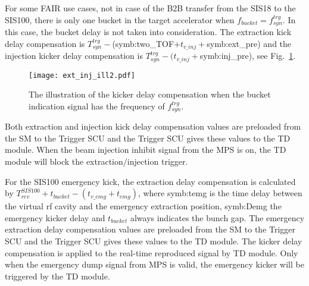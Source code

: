 For some FAIR use cases, not in case of the B2B transfer from the SIS18 to the SIS100, there is only one bucket in the target accelerator when $f_{\mathit{bucket}}=f_{\mathit{syn}}^{\mathit{trg}}$. In this case, the bucket delay is not taken into consideration. The extraction kick delay compensation is $T_{\mathit{syn}}^{\mathit{trg}} -$(\gls{symb:two_TOF}$ + t_{v\_inj}+ $\gls{symb:ext_pre}) and the injection kicker delay compensation is $T_{\mathit{syn}}^{\mathit{trg}} - (t_{v\_inj}+ $\gls{symb:inj_pre}), see Fig.~\ref{ext_inj_kicker1}. 
\begin{figure}[!htb]
   \centering   
   \texttt{[image: ext\_inj\_ill2.pdf]}
   \caption{The illustration of the kicker delay compensation when the bucket indication signal has the frequency of $f_{\mathit{syn}}^{\mathit{trg}}$.}
   \label{ext_inj_kicker1}
\end{figure}



Both extraction and injection kick delay compensation values are preloaded from the SM to the Trigger SCU and the Trigger SCU gives these values to the TD module. When the beam injection inhibit signal from the MPS is on, the TD module will block the extraction/injection trigger.

For the SIS100 emergency kick, the extraction delay compensation is calculated by $T_{\mathit{rev}}^{\mathit{SIS100}} + t_{bucket} - (t_{v\_emg} + t_{emg})$, where \gls{symb:temg} is the time delay between the virtual rf cavity and the emergency extraction position, \gls{symb:Demg} the emergency kicker delay and $t_{bucket}$ always indicates the bunch gap. The emergency extraction delay compensation values are preloaded from the SM to the Trigger SCU and the Trigger SCU gives these values to the TD module. The kicker delay compensation is applied to the real-time reproduced signal by TD module. Only when the emergency dump signal from MPS is valid, the emergency kicker will be triggered by the TD module.


